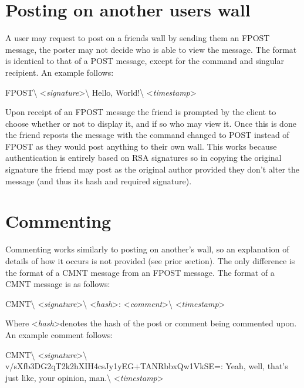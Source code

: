 \section{Posting on another users wall}
A user may request to post on a friends wall by sending them an FPOST message,
the poster may not decide who is able to view the message. The format is
identical to that of a POST message, except for the command and singular
recipient. An example follows:

\begin{center}
FPOST\textbackslash
\textless \textit{signature}\textgreater\textbackslash
Hello, World!\textbackslash
\textless \textit{timestamp}\textgreater
\end{center}

Upon receipt of an FPOST message the friend is prompted by the client to choose
whether or not to display it, and if so who may view it. Once this is done the
friend reposts the message with the command changed to POST instead of FPOST as
they would post anything to their own wall. This works because authentication is
entirely based on RSA signatures so in copying the original signature the friend
may post as the original author provided they don't alter the message (and thus
its hash and required signature).

\section{Commenting}
Commenting works similarly to posting on another's wall, so an explanation of
details of how it occurs is not provided (see prior section). The only
difference is the format of a CMNT message from an FPOST message. The format of
a CMNT message is as follows:

\begin{center}
CMNT\textbackslash
\textless \textit{signature}\textgreater\textbackslash
\textless \textit{hash}\textgreater:
\textless \textit{comment}\textgreater\textbackslash
\textless \textit{timestamp}\textgreater
\end{center}

Where \textless \textit{hash}\textgreater denotes the hash of the post or
comment being commented upon. An example comment follows:

\begin{center}
CMNT\textbackslash
\textless \textit{signature}\textgreater\textbackslash
v/sXfb3DG2qT2k2hXIH4csJy1yEG+TANRbbxQw1VkSE=:
Yeah, well, that's just like, your opinion, man.\textbackslash
\textless \textit{timestamp}\textgreater
\end{center}

